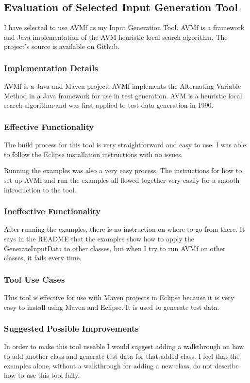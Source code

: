 \documentclass[letterpaper,10pt]{article}
\begin{document}
	\subsection{Evaluation of Selected Input Generation Tool}
	I have selected to use AVMf as my Input Generation Tool. AVMf is a framework and Java 
	implementation of the AVM heuristic local search algorithm. The project's source is 
	available on Github.
		\subsubsection{Implementation Details}
		AVMf is a Java and Maven project. AVMf implements the Alternating Variable Method 
		in a Java framework for use in test generation. AVM is a heuristic local search 
		algorithm and was first applied to test data generation in 1990.
		\subsubsection{Effective Functionality}
		The build process for this tool is very straightforward and easy to use. I was 
		able to follow the Eclipse installation instructions with no issues.

		Running the examples was also a very easy process. The instructions for how to set
		 up AVMf and run the examples all flowed together very easily for a smooth 
		introduction to the tool.
		\subsubsection{Ineffective Functionality}
		After running the examples, there is no instruction on where to go from there. It 
		says in the README that the examples show how to apply the GenerateInputData to 
		other classes, but when I try to run AVMf on other classes, it fails every time.

		\subsubsection{Tool Use Cases}
		This tool is effective for use with Maven projects in Eclipse because it is very 
		easy to install using Maven and Eclipse. It is used to generate test data.
		\subsubsection{Suggested Possible Improvements}
		In order to make this tool useable I would suggest adding a walkthrough on how to 
		add another class and generate test data for that added class. I feel that the 
		examples alone, without a walkthrough for adding a new class, do not describe how
		 to use this tool fully.
\end{document}
